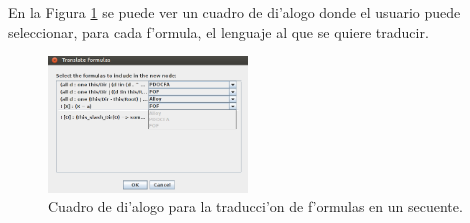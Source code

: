 En la Figura \ref{GUI form translation} se puede ver un cuadro de di'alogo donde el usuario puede seleccionar, para cada f'ormula, el lenguaje al que se quiere traducir.

\begin{figure}[tb]
	\includegraphics[width=200px]{img/translate.png}
	\centering
	\caption{Cuadro de di'alogo para la traducci'on de f'ormulas en un secuente.} \label{GUI form translation}
\end{figure}


